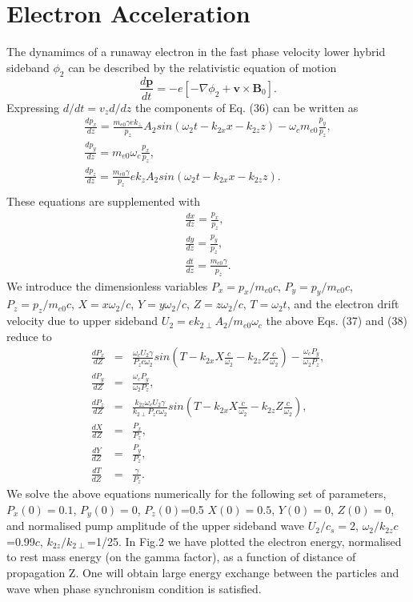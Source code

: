 \documentclass[aip,pop,amsmath,amssymb,showpacs,reprint,floatfix,lengthcheck]{revtex4-1}
\begin{document}
\section{Electron Acceleration}
The dynamimcs of a runaway electron in the fast phase velocity lower hybrid sideband $\phi_{2}$ can be described by the relativistic equation of motion
\begin{equation}
 \frac{d\textbf{p}}{dt}=-e[-\nabla\phi_{2}+\textbf{v}\times \textbf{B}_{0}].
\end{equation}
Expressing $d/dt=v_{z}d/dz$ the components of Eq. (36) can be written as
 \begin{eqnarray}
  \frac{dp_{x}}{dz}=\frac{m_{e0}\gamma ek_{\perp}}{p_{z}} A_{2}sin(\omega_{2}t-k_{2x}x-k_{2z}z)-\omega_{c} m_{e0}\frac{p_{y}}{p_{z}},\nonumber\\
\frac{dp_{y}}{dz}=m_{e0}\omega_{c} \frac{p_{x}}{p_{z}},\nonumber\\
\frac{dp_{z}}{dz}=\frac{m_{e0}\gamma}{p_{z}} ek_{z}A_{2}sin(\omega_{2}t-k_{2x}x-k_{2z}z).\nonumber\\
 \end{eqnarray}
These equations are supplemented with
\begin{eqnarray}
 \frac{dx}{dz}=\frac{p_{x}}{p_{z}},\nonumber\\
\frac{dy}{dz}=\frac{p_{y}}{p_{z}},\\
\frac{dt}{dz}=\frac{m_{e0}\gamma}{p_{z}}.\nonumber
\end{eqnarray}
We introduce the dimensionless variables $P_{x}=p_{x}/m_{e0}c$, $P_{y}=p_{y}/m_{e0}c$, $P_{z}=p_{z}/m_{e0}c$, $X=x\omega_{2}/c$, $Y=y\omega_{2}/c$, $Z=z\omega_{2}/c$, $T=\omega_{2}t$, and the electron drift velocity due to upper sideband $U_{2}=ek_{2\perp}A_{2}/m_{e0}\omega_{c}$
the above Eqs. (37) and (38) reduce to
 \begin{eqnarray}
  \frac{dP_{x}}{dZ}&=&\frac{\omega_{c}U_{2}\gamma}{P_{z}c\omega_{2}} sin(T-k_{2x}X\frac{c}{\omega_{2}}-k_{2z}Z\frac{c}{\omega_{2}})- \frac{\omega_{c} P_{y}}{\omega_{2}P_{z}},\nonumber\\
\frac{dP_{y}}{dZ}&=&\frac{\omega_{c} P_{y}}{\omega_{2}P_{z}},\nonumber\\
\frac{dP_{z}}{dZ}&=&\frac{k_{2z}\omega_{c}U_{2}\gamma}{k_{2\perp}P_{z}c\omega_{2}} sin(T-k_{2x}X\frac{c}{\omega_{2}}-k_{2z}Z\frac{c}{\omega_{2}}),\nonumber\\
\frac{dX}{dZ}&=&\frac{P_{x}}{P_{z}},\nonumber\\
\frac{dY}{dZ}&=&\frac{P_{y}}{P_{z}},\nonumber\\
\frac{dT}{dZ}&=&\frac{\gamma}{P_{z}}.
 \end{eqnarray}
We solve the above equations numerically for the following set of parameters, $P_{x}(0)=0.1$, $P_{y}(0)=0$, $P_{z}(0)$=0.5 $X(0)=0.5$, $Y(0)=0$, $Z(0)=0$, and normalised pump amplitude of the upper sideband wave $U_{2}/c_{s}=2$, $\omega_{2}/k_{2z}c$ =0.99$c$, $k_{2z}/k_{2\perp}$=1/25. In Fig.2 we have plotted the electron energy, normalised to rest mass energy (on the gamma factor), as a function of distance of propagation Z. One will obtain large energy exchange between the particles and wave when phase synchronism condition is satisfied.
\end{document}
